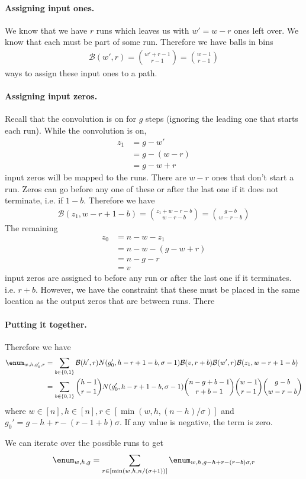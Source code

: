 \paragraph{Assigning input ones.} We know that we have $r$ runs which leaves us with $w'=w-r$ ones left over. We know that each must be part of some run. Therefore we have balls in bins
\begin{align}
\mathcal{B}(w',r)={w'+r-1\choose r-1}={w-1\choose r-1}
\end{align}
ways to assign these input ones to a path.

\paragraph{Assigning input zeros. } Recall that the convolution is on for $g$ steps (ignoring the leading one that starts each run). While the convolution is on, 
\begin{align*}    
z_1 &= g-w'\\
&=g-(w-r)\\
&=g-w+r
\end{align*}
input zeros will be mapped to the runs. There are $w-r$ ones that don't start a run. Zeros can go before any one of these or after the last one if it does not terminate, i.e. if $1-b$. Therefore we have 
\begin{align}
    \mathcal{B}(z_1, w-r+1-b)={z_1+w-r-b\choose w-r-b}={g-b\choose w-r-b}
\end{align}
The remaining 
\begin{align*}
z_0&=n-w-z_1\\
&=n-w-(g-w+r)\\
&=n-g-r\\
&=v
\end{align*}
input zeros are assigned to before any run or after the last one if it terminates. i.e. $r+b$. However, we have the constraint that these must be placed in the same location as the output zeros that are between runs. There







\paragraph{Putting it together.} Therefore we have
\begin{align*}
\enum_{w,h,g_0',r}&=\sum_{b\in\{0,1\}}
\mathcal{B}(h',r)
N(g_0', h-r+1-b, \sigma-1)
\mathcal{B}(v,r+b)
\mathcal{B}(w',r)
\mathcal{B}(z_1,w-r+1-b)\\
&=\sum_{b\in\{0,1\}}
{h-1\choose r-1}
N(g_0', h-r+1-b, \sigma-1)
{n-g+b-1\choose r+b-1}
{w-1\choose r-1}
{g-b\choose w-r-b}
\end{align*}
where $w\in[n],h\in[n],r\in [\min(w,h,(n-h)/\sigma)]$ and $g_0'=g-h+r-(r-1+b)\sigma$. If any value is negative, the term is zero.

We can iterate over the possible runs to get
$$
\enum_{w,h,g}=\sum_{r\in[\min(w,h,n/(\sigma+1))]} \enum_{w,h,g-h+r-(r-b)\sigma, r}
$$



\fi
